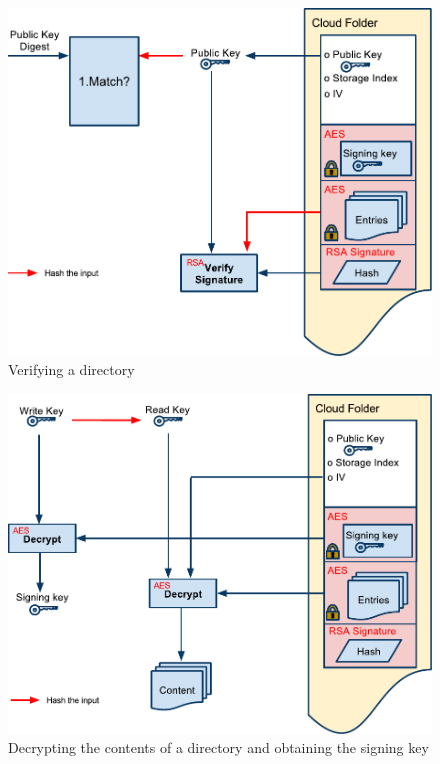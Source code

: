 \documentclass[pdftex,english,10pt,b5paper,twoside]{book}
\begin{document}
\begin{figure}[h!]
    \centering
    \includegraphics[width=\columnwidth]{CryptoVerifyOpenFolder.pdf}
    \caption{Verifying a directory}
    \label{fig:CS:VOD}
\end{figure}

\begin{figure}[h!]
    \centering
    \includegraphics[width=\columnwidth]{CryptoOpenFolder.pdf}
    \caption{Decrypting the contents of a directory and obtaining the signing
    key}
    \label{fig:CS:OD}
\end{figure}
\end{document}
